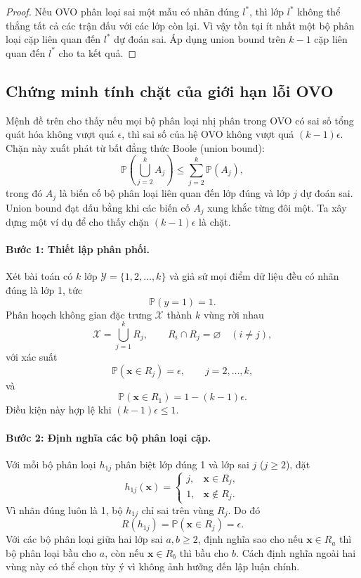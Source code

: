 \begin{proof}
Nếu OVO phân loại sai một mẫu có nhãn đúng $l^*$, thì lớp $l^*$ không thể thắng tất cả các trận đấu với các lớp còn lại. Vì vậy tồn tại ít nhất một bộ phân loại cặp liên quan đến $l^*$ dự đoán sai. Áp dụng union bound trên $k-1$ cặp liên quan đến $l^*$ cho ta kết quả.
\end{proof}


\begin{expandbox}
\subsection*{Chứng minh tính chặt của giới hạn lỗi OVO}

Mệnh đề trên cho thấy nếu mọi bộ phân loại nhị phân trong OVO có sai số tổng quát hóa không vượt quá $\epsilon$, thì sai số của hệ OVO không vượt quá $(k-1)\epsilon$. Chặn này xuất phát từ bất đẳng thức Boole (union bound):
\[
  \mathbb{P}\left(\bigcup_{j=2}^{k}A_j\right)
  \leq \sum_{j=2}^{k}\mathbb{P}(A_j),
\]
trong đó $A_j$ là biến cố bộ phân loại liên quan đến lớp đúng và lớp $j$ dự đoán sai. Union bound đạt dấu bằng khi các biến cố $A_j$ xung khắc từng đôi một. Ta xây dựng một ví dụ để cho thấy chặn $(k-1)\epsilon$ là chặt.

\paragraph{Bước 1: Thiết lập phân phối.}
Xét bài toán có $k$ lớp $\mathcal{Y}=\{1,2,\ldots,k\}$ và giả sử mọi điểm dữ liệu đều có nhãn đúng là lớp 1, tức
\[
  \mathbb{P}(y=1)=1.
\]
Phân hoạch không gian đặc trưng $\mathcal{X}$ thành $k$ vùng rời nhau
\[
  \mathcal{X}=\bigcup_{j=1}^{k}R_j,
  \qquad R_i\cap R_j=\varnothing\quad (i\neq j),
\]
với xác suất
\[
  \mathbb{P}(\bm{x}\in R_j)=\epsilon,
  \qquad j=2,\ldots,k,
\]
và
\[
  \mathbb{P}(\bm{x}\in R_1)=1-(k-1)\epsilon.
\]
Điều kiện này hợp lệ khi $(k-1)\epsilon\leq 1$.

\paragraph{Bước 2: Định nghĩa các bộ phân loại cặp.}
Với mỗi bộ phân loại $h_{1j}$ phân biệt lớp đúng 1 và lớp sai $j$ ($j\geq 2$), đặt
\[
  h_{1j}(\bm{x})=
  \begin{cases}
    j, & \bm{x}\in R_j,\\
    1, & \bm{x}\notin R_j.
  \end{cases}
\]
Vì nhãn đúng luôn là 1, bộ $h_{1j}$ chỉ sai trên vùng $R_j$. Do đó
\[
  R(h_{1j})=\mathbb{P}(\bm{x}\in R_j)=\epsilon.
\]
Với các bộ phân loại giữa hai lớp sai $a,b\geq 2$, định nghĩa sao cho nếu $\bm{x}\in R_a$ thì bộ phân loại bầu cho $a$, còn nếu $\bm{x}\in R_b$ thì bầu cho $b$. Cách định nghĩa ngoài hai vùng này có thể chọn tùy ý vì không ảnh hưởng đến lập luận chính.


\end{expandbox}
